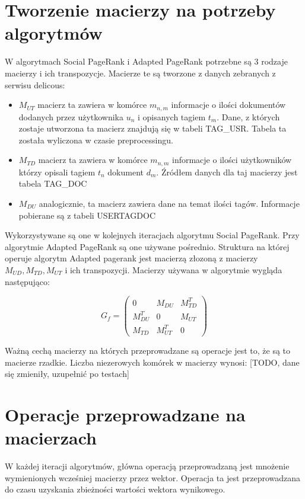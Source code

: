 
\section{Tworzenie macierzy na potrzeby algorytmów}
W algorytmach Social PageRank i Adapted PageRank potrzebne są 3 rodzaje macierzy i ich transpozycje. Macierze te są tworzone z danych zebranych z serwisu delicous:
\begin{itemize}
	\item $M_{UT}$ macierz ta zawiera w komórce $m_{n,m}$ informacje o ilości dokumentów dodanych przez użytkownika $u_n$ i opisanych tagiem $t_m$. Dane, z których zostaje utworzona ta macierz znajdują się w tabeli TAG\_USR. Tabela ta została wyliczona w czasie preprocessingu.
	\item $M_{TD}$ macierz ta zawiera w komórce $m_{n,m}$ informacje o ilości użytkowników którzy opisali tagiem $t_n$ dokument $d_m$. Źródłem danych dla taj macierzy jest tabela TAG\_DOC
	\item $M_{DU}$ analogicznie, ta macierz zawiera dane na temat ilości tagów. Informacje pobierane są z tabeli USERTAGDOC
\end{itemize}

Wykorzystywane są one w kolejnych iteracjach algorytmu Social PageRank. Przy algorytmie Adapted PageRank są one używane pośrednio. Struktura na której operuje algorytm Adapted pagerank jest macierzą złozoną z macierzy $M_{UD} , M_{TD}, M_{UT}$ i ich transpozycji. Macierzy używana w algorytmie wygląda następująco:

\[
 G_f =
 \begin{pmatrix}
  0                     & M_{DU}       & M_{TD}^T \\
  M_{DU}^T  & 0                     & M_{UT}     \\
  M_{TD}       & M_{UT}^T   & 0 
 \end{pmatrix}
\]

Ważną cechą macierzy na których przeprowadzane są operacje jest to, że są to macierze rzadkie. Liczba niezerowych komórek w macierzy wynosi:  [TODO, dane się zmieniły, uzupełnić po testach]

\section{Operacje przeprowadzane na macierzach}
W każdej iteracji algorytmów, główna operacją przeprowadzaną jest mnożenie wymienionych wcześniej macierzy przez wektor. Operacja ta jest przeprowadzana do czasu uzyskania zbieżności wartości wektora wynikowego.

